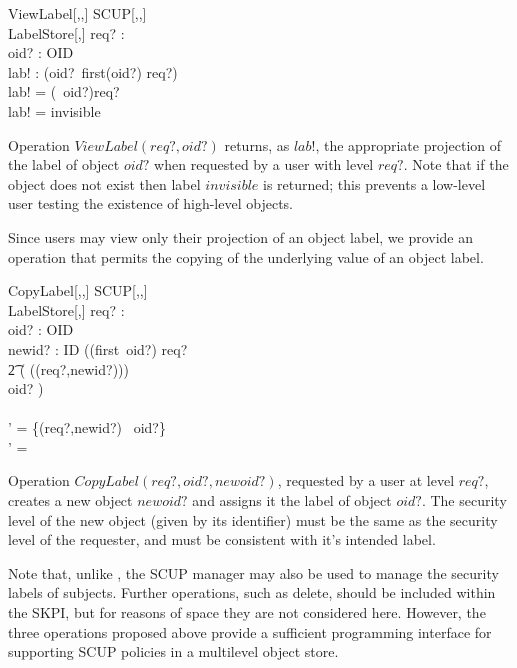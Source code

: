 \begin{schema}{ViewLabel[\LEVEL,\LABEL,\FID]}
SCUP[\LEVEL,\LABEL,\FID] \\
\Xi LabelStore[\LEVEL,\LABEL] \also
req? : \LEVEL \\
oid? : OID\\
lab! : \LABEL
\where
\IF (oid?\in\dom~\delta\land first(oid?) \fleq req?) \\ 
\THEN lab! = (\delta~oid?)\lproj req? \\
\ELSE lab! = invisible
\end{schema}
Operation $ViewLabel(req?,oid?)$ returns, as $lab!$, the appropriate 
projection of the label of object $oid?$ when requested by a user with 
level $req?$.  Note that if the object does not exist then label 
$invisible$ is returned; this prevents a low-level user 
testing the existence of  high-level objects. 

Since users may view only their projection of an object label,
we provide an operation that permits the copying of the 
underlying value of an object label. 
\begin{schema}{CopyLabel[\LEVEL,\LABEL,\FID]}
SCUP[\LEVEL,\LABEL,\FID] \\
\Delta LabelStore[\LEVEL,\LABEL] \also
req? : \LEVEL \\
oid? : OID\\
newid? : ID
\where
\IF ((first~oid?) \fleq req?\\ 
\t2 \land ( \lnot ((req?,newid?)\in \dom\delta)) \\
\land  oid? \in \dom \delta)  \\
\\
\THEN \delta' = \delta \cup \{(req?,newid?) \mapsto \delta~oid?\}
\\
\ELSE \delta' = \delta
\end{schema}
Operation $CopyLabel(req?,oid?,newoid?)$, requested by a user at 
level $req?$,  creates a new object 
$newoid?$ and assigns it the label of object $oid?$. 
The security level of the new object (given by its identifier) must be 
the same as the security level of the requester, and must be
consistent with it's intended label. 

Note that, unlike \cite{FGQ:oak:96}, the SCUP manager may also be used
to manage the security labels of subjects.  Further operations, such as
delete, should be included within the SKPI, but for reasons of space
they are not considered here.  However, the three operations proposed
above provide a sufficient programming interface for supporting SCUP
policies in a multilevel object store.


